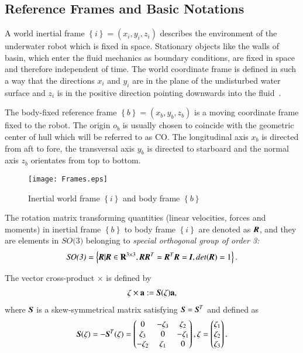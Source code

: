 \subsection{Reference Frames and Basic Notations}
A world inertial frame $\left\{ i \right\}=(x_{i},y_{i},z_{i})$ describes the environment of the underwater robot which is fixed in space. Stationary objects like the walls of basin, which enter the fluid mechanics as boundary conditions, are fixed in space and therefore independent of time. The world coordinate frame is defined in such a way that the directions $x_{i}$ and  
$y_{i}$ are in the plane of the undisturbed water surface and $z_{i}$ is in the positive direction pointing downwards into the fluid~\cite{Vollmayr2014}.

The body-fixed reference frame $\left\{ b \right\}=(x_{b},y_{b},z_{b})$ is a moving coordinate frame fixed to the robot. The origin $o_{b}$ is usually chosen to coincide with the geometric center of hull which will be referred to as CO. The longitudinal axis $x_{b}$ is directed from aft to fore, the transversal axis $y_{b}$ is directed to starboard and the normal axis $z_{b}$ orientates from top to bottom. 
\begin{figure}
\texttt{[image: Frames.eps]}
\caption{Inertial world frame $\left\{ i \right\}$ and body frame $\left\{ b \right\}$}	
\label{FIG:FM}
\end{figure}

The rotation matrix transforming quantities (linear velocities, forces and moments) in inertial frame $\left\{ b \right\}$ to body frame $\left\{ i \right\}$ are denoted as $\emph{\textbf{R}}$, and they are elements in $\textit{SO(3)}$ belonging to \textit{special orthogonal group of order 3:}
\begin{align}
\textit{SO(3)}=\left\{ \emph{\textbf{R}}|\emph{\textbf{R}}\in\mathbf{R}^{3\times3}, \emph{\textbf{R}}\emph{\textbf{R}}^{T}=\emph{\textbf{R}}^{T}\emph{\textbf{R}}=\emph{\textbf{I}}, det(\emph{\textbf{R}})=1\right\}.
\end{align}

The vector cross-product $\times$ is defined by
\begin{align}
\vec{\zeta} \times \vec{a}:=\emph{\textbf{S}}(\vec{\zeta})\vec{a},
\end{align}
where $\emph{\textbf{S}}$ is a skew-symmetrical matrix satisfying $\emph{\textbf{S}}=\emph{\textbf{S}}^{T}$ and defined as
\begin{align}
\emph{\textbf{S}}(\vec{\zeta})=-\emph{\textbf{S}}^{T}(\vec{\zeta})=\begin{pmatrix}
0&-\zeta_{3}&\zeta_{2}\\
\zeta_{3}&0&-\zeta_{1}\\
-\zeta_{2}&\zeta_{1}&0
\end{pmatrix}, \vec{\zeta}=\begin{pmatrix}
\zeta_{1}\\
\zeta_{2}\\
\zeta_{3}
\end{pmatrix}.\label{EQ:CrossProduct}
\end{align}


